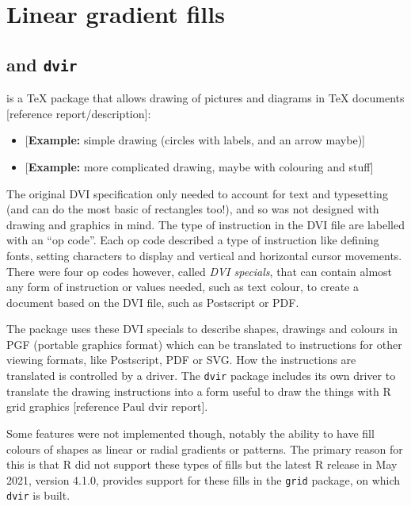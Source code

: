 \documentclass[]{article}
\begin{document}
\newpage{}

\section{Linear gradient fills}\label{linear-gradient-fills}

\subsection{\texorpdfstring{\Tikz{} and
\texttt{dvir}}{ and dvir}}\label{and-dvir}

\Tikz{} is a \TeX{} package that allows drawing of pictures and diagrams
in \TeX{} documents {[}reference \Tikz{} report/description{]}:

\begin{itemize}
\item
  {[}\textbf{Example:} simple \Tikz{} drawing (circles with labels, and
  an arrow maybe){]}
\item
  {[}\textbf{Example:} more complicated \Tikz{} drawing, maybe with
  colouring and stuff{]}
\end{itemize}

The original DVI specification only needed to account for text and
typesetting (and can do the most basic of rectangles too!), and so was
not designed with drawing and graphics in mind. The type of instruction
in the DVI file are labelled with an ``op code''. Each op code described
a type of instruction like defining fonts, setting characters to display
and vertical and horizontal cursor movements. There were four op codes
however, called \emph{DVI specials}, that can contain almost any form of
instruction or values needed, such as text colour, to create a document
based on the DVI file, such as Postscript or PDF.

The \Tikz{} package uses these DVI specials to describe shapes, drawings
and colours in PGF (portable graphics format) which can be translated to
instructions for other viewing formats, like Postscript, PDF or SVG. How
the instructions are translated is controlled by a \Tikz{} driver. The
\texttt{dvir} package includes its own \Tikz{} driver to translate the
drawing instructions into a form useful to draw the things with R grid
graphics {[}reference Paul dvir \Tikz{} report{]}.

Some \Tikz{} features were not implemented though, notably the ability
to have fill colours of shapes as linear or radial gradients or
patterns. The primary reason for this is that R did not support these
types of fills but the latest R release in May 2021, version 4.1.0,
provides support for these fills in the \texttt{grid} package, on which
\texttt{dvir} is built.
\end{document}
